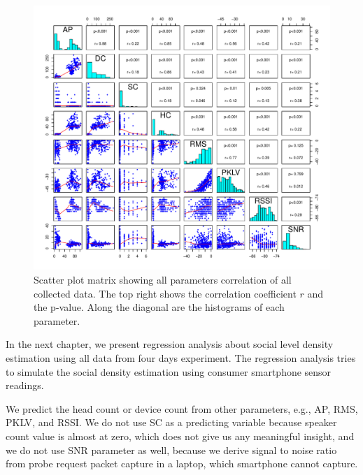	\begin{figure}[h]
		\begin{adjustwidth}{-3cm}{}
		\centering
		\includegraphics[width=1.3\textwidth]{./img/result/all-result}
		\end{adjustwidth}
		\caption[Scatter plot matrix showing all parameters correlation.]
		{Scatter plot matrix showing all parameters correlation of all collected data. The top right shows the correlation coefficient $r$ and the p-value. Along the diagonal are the histograms of each parameter.}
		\label{fig:scatterplot-matrix}
	\end{figure}

	In the next chapter, we present regression analysis about social level density estimation using all data from four days experiment. The regression analysis tries to simulate the social density estimation using consumer smartphone sensor readings.

	We predict the head count or device count from other parameters, e.g., \ac{AP}, \ac{RMS}, \ac{PKLV}, and \ac{RSSI}. We do not use \ac{SC} as a predicting variable because speaker count value is almost at zero, which does not give us any meaningful insight, and we do not use \ac{SNR} parameter as well, because we derive signal to noise ratio from probe request packet capture in a laptop, which smartphone cannot capture.

